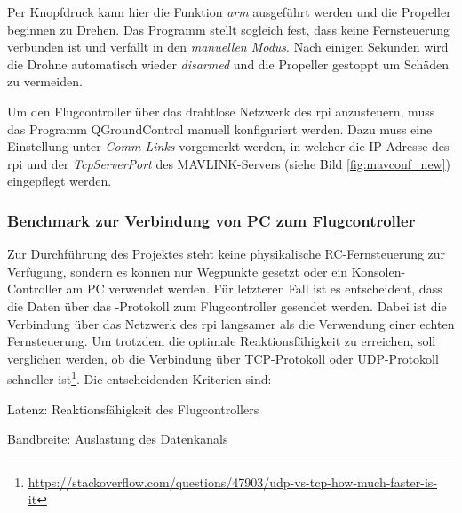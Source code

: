 Per Knopfdruck kann hier die Funktion \textit{arm} ausgeführt werden und die Propeller beginnen zu Drehen. Das Programm stellt sogleich fest, dass keine Fernsteuerung verbunden ist und verfällt in den \textit{manuellen Modus}. Nach einigen Sekunden wird die Drohne automatisch wieder \textit{disarmed} und die Propeller gestoppt um Schäden zu vermeiden.

Um den Flugcontroller über das drahtlose Netzwerk des \gls{rpi} anzusteuern, muss das Programm QGroundControl manuell konfiguriert werden. Dazu muss eine Einstellung unter \textit{Comm Links} vorgemerkt werden, in welcher die IP-Adresse des \gls{rpi} und der \textit{TcpServerPort} des MAVLINK-Servers (siehe Bild \ref{fig:mavconf_new}) eingepflegt werden.


\subsubsection{Benchmark zur Verbindung von PC zum Flugcontroller}\label{chap:bench_tcp_udp}
Zur Durchführung des Projektes steht keine physikalische RC-Fernsteuerung zur Verfügung, sondern es können nur Wegpunkte gesetzt oder ein Konsolen-Controller am PC verwendet werden. Für letzteren Fall ist es entscheident, dass die Daten über das -Protokoll zum Flugcontroller gesendet werden. Dabei ist die Verbindung über das Netzwerk des \gls{rpi} langsamer als die Verwendung einer echten Fernsteuerung. Um trotzdem die optimale Reaktionsfähigkeit zu erreichen, soll verglichen werden, ob die Verbindung über TCP-Protokoll oder UDP-Protokoll schneller ist\footnote{\url{https://stackoverflow.com/questions/47903/udp-vs-tcp-how-much-faster-is-it}}. Die entscheidenden Kriterien sind:
\begin{compactitem}
    \item Latenz: Reaktionsfähigkeit des Flugcontrollers
    \item Bandbreite: Auslastung des Datenkanals 
\end{compactitem}

